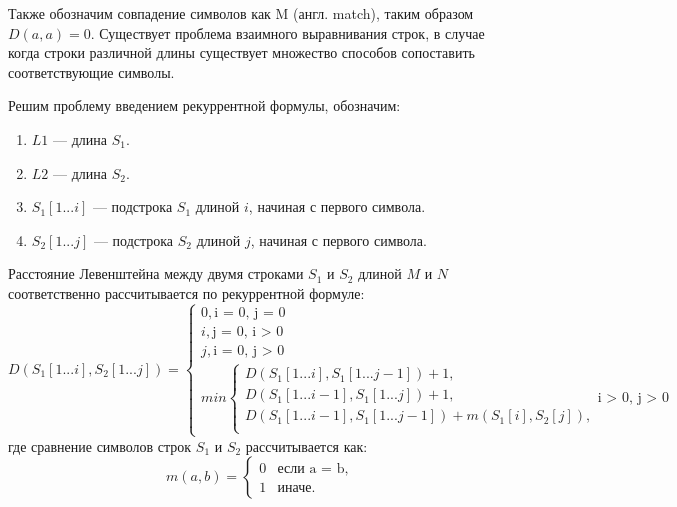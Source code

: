 Также обозначим совпадение символов как M (англ. match), таким образом $D(a,a) = 0$.
Существует  проблема взаимного выравнивания строк, в случае когда строки различной длины существует множество способов сопоставить соответствующие символы.

Решим проблему введением рекуррентной формулы, обозначим:
\begin{enumerate}[label*=\arabic*.]
	\item $L1$ --- длина $S_{1}$.
	\item $L2$ --- длина $S_{2}$.
	\item $S_{1}[1...i]$ --- подстрока $S_{1}$ длиной $i$, начиная с первого символа.
	\item $S_{2}[1...j]$ --- подстрока $S_{2}$ длиной $j$, начиная с первого символа.
\end{enumerate}



Расстояние Левенштейна между двумя строками $S_{1}$ и $S_{2}$ длиной $M$ и $N$ соответственно рассчитывается по рекуррентной формуле:
\begin{equation}
	\label{eq:Levenshtein_req}
	D(S_{1}[1...i], S_{2}[1...j]) =
	\begin{cases}
		0, \text{i = 0, j = 0}\\
		i, \text{j = 0, i > 0}\\
		j, \text{i = 0, j > 0}\\
		min \begin{cases}
			D(S_{1}[1...i], S_{1}[1...j - 1]) + 1,\\
			D(S_{1}[1...i - 1], S_{1}[1...j]) + 1,\\
			D(S_{1}[1...i - 1], S_{1}[1...j - 1]) +  m(S_{1}[i], S_{2}[j]), \\
		\end{cases}
		\text{i > 0, j > 0}
	\end{cases}
\end{equation}
где сравнение символов строк $S_1$ и $S_2$ рассчитывается как:
\begin{equation}
	\label{eq:m}
	m(a, b) = \begin{cases}
		0 &\text{если a = b,}\\
		1 &\text{иначе.}
	\end{cases}
\end{equation}


